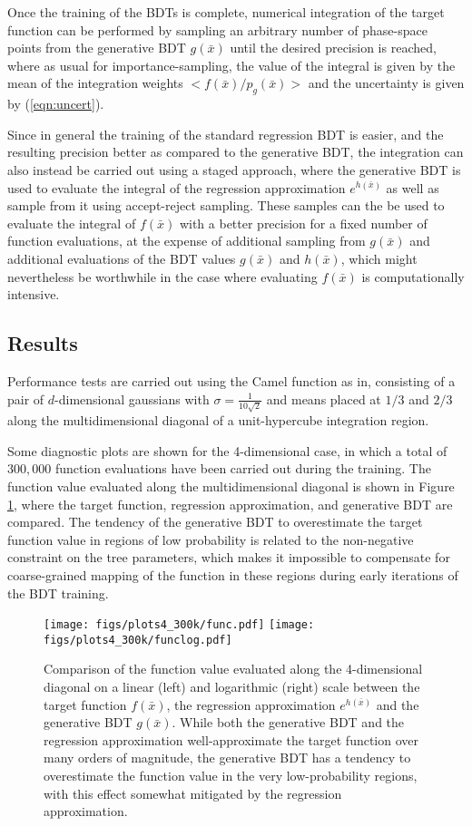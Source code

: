 \documentclass[a4paper,11pt]{article}
\begin{document}
Once the training of the BDTs is complete, numerical integration of the target function can be performed by sampling an arbitrary number of phase-space points from the generative BDT $g(\bar x)$ until the desired precision is reached, where as usual for importance-sampling, the value of the integral is given by the mean of the integration weights $<f(\bar x)/p_g(\bar x)>$ and the uncertainty is given by (\ref{eqn:uncert}).

Since in general the training of the standard regression BDT is easier, and the resulting precision better as compared to the generative BDT, the integration can also instead be carried out using a staged approach, where the generative BDT is used to evaluate the integral of the regression approximation $e^{h(\bar x)}$ as well as sample from it using accept-reject sampling.  These samples can the be used to evaluate the integral of $f(\bar x)$ with a better precision for a fixed number of function evaluations, at the expense of additional sampling from $g(\bar x)$ and additional evaluations of the BDT values $g(\bar x)$ and $h(\bar x)$, which might nevertheless be worthwhile in the case where evaluating $f(\bar x)$ is computationally intensive.

\subsection{Results}

Performance tests are carried out using the Camel function as in\cite{vegas}, consisting of a pair of $d$-dimensional gaussians with $\sigma = \frac{1}{10\sqrt{2}}$ and means placed at $1/3$ and $2/3$ along the multidimensional diagonal of a unit-hypercube integration region.

Some diagnostic plots are shown for the 4-dimensional case, in which a total of $300,000$ function evaluations have been carried out during the training.  The function value evaluated along the multidimensional diagonal is shown in Figure \ref{fig:diag4d}, where the target function, regression approximation, and generative BDT are compared.  The tendency of the generative BDT to overestimate the target function value in regions of low probability is related to the non-negative constraint on the tree parameters, which makes it impossible to compensate for coarse-grained mapping of the function in these regions during early iterations of the BDT training.

\begin{figure}[htb!]
 \texttt{[image: figs/plots4\_300k/func.pdf]}
 \texttt{[image: figs/plots4\_300k/funclog.pdf]}
 \caption{Comparison of the function value evaluated along the 4-dimensional diagonal on a linear (left) and logarithmic (right) scale between the target function $f(\bar x)$, the regression approximation $e^{h(\bar x)}$ and the generative BDT $g(\bar x)$.  While both the generative BDT and the regression approximation well-approximate the target function over many orders of magnitude, the generative BDT has a tendency to overestimate the function value in the very low-probability regions, with this effect somewhat mitigated by the regression approximation.}
 \label{fig:diag4d}
\end{figure}
\end{document}
